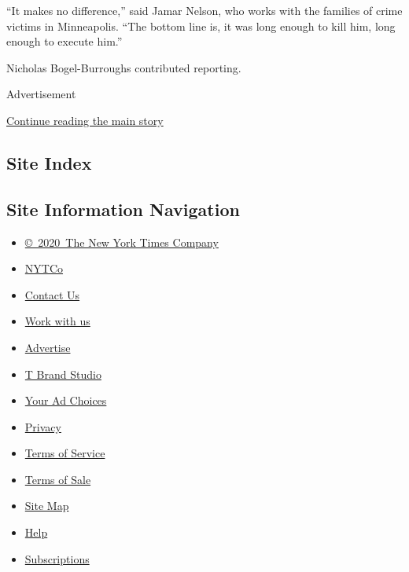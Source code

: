 ``It makes no difference,'' said Jamar Nelson, who works with the
families of crime victims in Minneapolis. ``The bottom line is, it was
long enough to kill him, long enough to execute him.''

Nicholas Bogel-Burroughs contributed reporting.

Advertisement

\protect\hyperlink{after-bottom}{Continue reading the main story}

\hypertarget{site-index}{%
\subsection{Site Index}\label{site-index}}

\hypertarget{site-information-navigation}{%
\subsection{Site Information
Navigation}\label{site-information-navigation}}

\begin{itemize}
\tightlist
\item
  \href{https://help.nytimes3xbfgragh.onion/hc/en-us/articles/115014792127-Copyright-notice}{©~2020~The
  New York Times Company}
\end{itemize}

\begin{itemize}
\tightlist
\item
  \href{https://www.nytco.com/}{NYTCo}
\item
  \href{https://help.nytimes3xbfgragh.onion/hc/en-us/articles/115015385887-Contact-Us}{Contact
  Us}
\item
  \href{https://www.nytco.com/careers/}{Work with us}
\item
  \href{https://nytmediakit.com/}{Advertise}
\item
  \href{http://www.tbrandstudio.com/}{T Brand Studio}
\item
  \href{https://www.nytimes3xbfgragh.onion/privacy/cookie-policy\#how-do-i-manage-trackers}{Your
  Ad Choices}
\item
  \href{https://www.nytimes3xbfgragh.onion/privacy}{Privacy}
\item
  \href{https://help.nytimes3xbfgragh.onion/hc/en-us/articles/115014893428-Terms-of-service}{Terms
  of Service}
\item
  \href{https://help.nytimes3xbfgragh.onion/hc/en-us/articles/115014893968-Terms-of-sale}{Terms
  of Sale}
\item
  \href{https://spiderbites.nytimes3xbfgragh.onion}{Site Map}
\item
  \href{https://help.nytimes3xbfgragh.onion/hc/en-us}{Help}
\item
  \href{https://www.nytimes3xbfgragh.onion/subscription?campaignId=37WXW}{Subscriptions}
\end{itemize}
